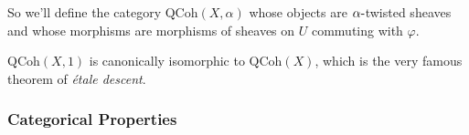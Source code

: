 So we'll define the category \({\mathrm{QCoh}}(X, \alpha)\) whose
objects are \(\alpha{\hbox{-}}\)twisted sheaves and whose morphisms are
morphisms of sheaves on \(U\) commuting with \(\varphi\).

\begin{example}[?]

\({\mathrm{QCoh}}(X, 1)\) is canonically isomorphic to
\({\mathrm{QCoh}}(X)\), which is the very famous theorem of \emph{étale
descent}.

\end{example}

\hypertarget{categorical-properties}{%
\subsubsection{Categorical Properties}\label{categorical-properties}}

